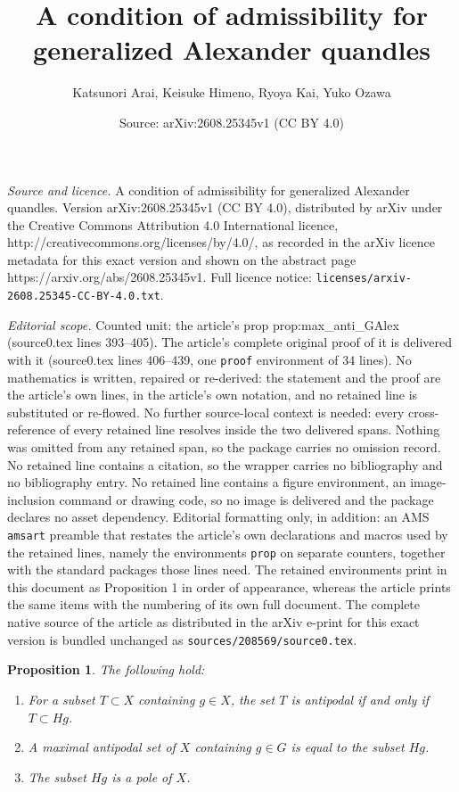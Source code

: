 \documentclass[10pt,a4paper]{amsart}
\title{A condition of admissibility for generalized Alexander quandles}
\author{Katsunori Arai, Keisuke Himeno, Ryoya Kai, Yuko Ozawa}
\date{Source: arXiv:2608.25345v1 (CC BY 4.0)}
\newtheorem{prop}{Proposition}
\begin{document}
\maketitle

\noindent\emph{Source and licence.} A condition of admissibility for generalized Alexander quandles. Version arXiv:2608.25345v1 (CC BY 4.0), distributed by arXiv under the Creative Commons Attribution 4.0 International licence, http://creativecommons.org/licenses/by/4.0/, as recorded in the arXiv licence metadata for this exact version and shown on the abstract page https://arxiv.org/abs/2608.25345v1. Full licence notice: \texttt{licenses/arxiv-2608.25345-CC-BY-4.0.txt}.\par\smallskip

\noindent\textit{Editorial scope.} Counted unit: the article's prop prop:max\_anti\_GAlex (source0.tex lines 393--405). The article's complete original proof of it is delivered with it (source0.tex lines 406--439, one \texttt{proof} environment of 34 lines). No mathematics is written, repaired or re-derived: the statement and the proof are the article's own lines, in the article's own notation, and no retained line is substituted or re-flowed.  No further source-local context is needed: every cross-reference of every retained line resolves inside the two delivered spans.  Nothing was omitted from any retained span, so the package carries no omission record.  No retained line contains a citation, so the wrapper carries no bibliography and no bibliography entry.  No retained line contains a figure environment, an image-inclusion command or drawing code, so no image is delivered and the package declares no asset dependency.  Editorial formatting only, in addition: an AMS \texttt{amsart} preamble that restates the article's own declarations and macros used by the retained lines, namely the environments \texttt{prop} on separate counters, together with the standard packages those lines need.  The retained environments print in this document as Proposition 1 in order of appearance, whereas the article prints the same items with the numbering of its own full document.  The complete native source of the article as distributed in the arXiv e-print for this exact version is bundled unchanged as \texttt{sources/208569/source0.tex}.
\begin{prop}\label{prop:max_anti_GAlex}
  The following hold:
  \begin{enumerate}
    \item[$(1)$] For a subset $T \subset X$ containing $g \in X$,
    the set $T$ is antipodal if and only if $T \subset Hg$.

    \item[$(2)$] A maximal antipodal set of $X$ containing $g \in G$ is equal to the subset $Hg$.

    \item[$(3)$] The subset $Hg$ is a pole of $X$.
  \end{enumerate}
\end{prop}
\end{document}
